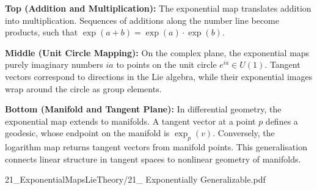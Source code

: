 \begin{SideNotePage}{
  \textbf{Top (Addition and Multiplication):} The exponential map translates addition into multiplication. Sequences of additions along the number line become products, such that $\exp(a+b)=\exp(a)\cdot\exp(b)$. \par
  \textbf{Middle (Unit Circle Mapping):} On the complex plane, the exponential maps purely imaginary numbers $ia$ to points on the unit circle $e^{ia}\in U(1)$. Tangent vectors correspond to directions in the Lie algebra, while their exponential images wrap around the circle as group elements. \par
  \textbf{Bottom (Manifold and Tangent Plane):} In differential geometry, the exponential map extends to manifolds. A tangent vector at a point $p$ defines a geodesic, whose endpoint on the manifold is $\exp_p(v)$. Conversely, the logarithm map returns tangent vectors from manifold points. This generalisation connects linear structure in tangent spaces to nonlinear geometry of manifolds. \par
}{21_ExponentialMapsLieTheory/21_ Exponentially Generalizable.pdf}
\end{SideNotePage}
